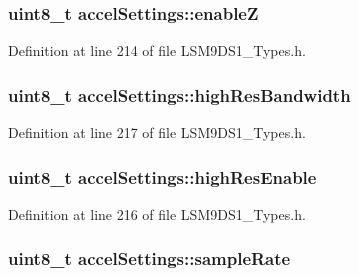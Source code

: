 \subsubsection[{\texorpdfstring{enableZ}{enableZ}}]{\setlength{\rightskip}{0pt plus 5cm}uint8\+\_\+t accel\+Settings\+::enableZ}\hypertarget{structaccel_settings_abdb5ee5fb9a802315d8340ea5d83b587}{}\label{structaccel_settings_abdb5ee5fb9a802315d8340ea5d83b587}


Definition at line 214 of file L\+S\+M9\+D\+S1\+\_\+\+Types.\+h.

\subsubsection[{\texorpdfstring{high\+Res\+Bandwidth}{highResBandwidth}}]{\setlength{\rightskip}{0pt plus 5cm}uint8\+\_\+t accel\+Settings\+::high\+Res\+Bandwidth}\hypertarget{structaccel_settings_a3925a8342b5a4b3caecd187e729954f3}{}\label{structaccel_settings_a3925a8342b5a4b3caecd187e729954f3}


Definition at line 217 of file L\+S\+M9\+D\+S1\+\_\+\+Types.\+h.

\subsubsection[{\texorpdfstring{high\+Res\+Enable}{highResEnable}}]{\setlength{\rightskip}{0pt plus 5cm}uint8\+\_\+t accel\+Settings\+::high\+Res\+Enable}\hypertarget{structaccel_settings_ad165444ae7996ff6160be01d77d33b62}{}\label{structaccel_settings_ad165444ae7996ff6160be01d77d33b62}


Definition at line 216 of file L\+S\+M9\+D\+S1\+\_\+\+Types.\+h.

\subsubsection[{\texorpdfstring{sample\+Rate}{sampleRate}}]{\setlength{\rightskip}{0pt plus 5cm}uint8\+\_\+t accel\+Settings\+::sample\+Rate}\hypertarget{structaccel_settings_a51704cb40f1e72ec298f601fedcc6092}{}\label{structaccel_settings_a51704cb40f1e72ec298f601fedcc6092}


